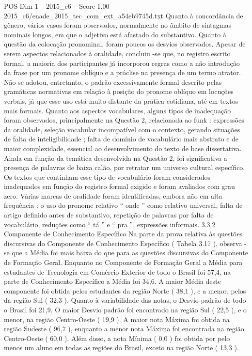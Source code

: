 \begin{textsample}{POS Dim 1 – 2015\_c6 – Score 1.00 – 2015\_c6/enade\_2015\_tec\_com\_ext\_a54eb9745d.txt}
Quanto à concordância de gênero, vários casos foram observados, normalmente no âmbito de sintagmas nominais longos, em que o adjetivo está afastado do substantivo.
Quanto à questão da colocação pronominal, foram poucos os desvios observados.
Apesar de serem aspectos relacionados à oralidade, concluiu -se que, no registro escrito formal, a maioria dos participantes já incorporou regras como a não introdução da frase por um pronome oblíquo e a próclise na presença de um termo atrator.
Não se adotou, entretanto, o padrão excessivamente formal descrito pelas gramáticas normativas em relação à posição do pronome oblíquo em locuções verbais, já que esse uso está muito distante da prática cotidiana, até em textos mais formais.
Quanto aos aspectos vocabulares, alguns tipos de inadequação foram observados, principalmente na Questão 2, relacionada ao funk : expressões da oralidade, seleção vocabular incompatível com o contexto, gerando situações de falta de inteligibilidade ; falta de domínio de vocabulário mais abstrato e de maior complexidade, essencial ao desenvolvimento do texto de base dissertativa.
Ainda em função da temática desenvolvida na Questão 2, foi significativa a presença de palavras de baixa calão, por retratar um universo cultural específico.
Os textos que continham esse tipo de vocabulário foram considerados inadequados em função do registro formal exigido e foram avaliados com grau zero.
Várias marcas de oralidade foram identificadas, embora não em alta frequência : o uso do pronome relativo “ onde ” como relativo universal, falta de artigo definido antes de substantivo, repetição de palavras por falta de vocabulário, reduções como “ tá ” e “ pra ”, expressões informais. 3.3.2 Componente de Conhecimento Específico Na parte da prova relativa às questões discursivas do Componente de Conhecimento Específico ( Tabela 3.17 ), observa -se que a Média foi mais baixa do que para as questões discursivas do Componente de Formação Geral.
Enquanto no Componente de Formação Geral a Média para estudantes de Tecnologia em Comércio Exterior de todo o Brasil foi 57,4, na parte de Conhecimento Específico a Média foi 34,6.
A maior Média deste componente foi obtida pelos estudantes da região Norte ( 38,1 ), e a menor, pelos da região Sul ( 32,3 ).
Quanto à variabilidade das notas, o Desvio padrão de todo o Brasil foi 21,9.
O maior Desvio padrão foi encontrado na região Sul ( 22,5 ), e o menor, na região Centro-Oeste ( 19,9 ).
A maior nota Máxima foi obtida na região Sudeste ( 96,7 ), enquanto a menor nota Máxima foi encontrada na região Centro-Oeste ( 60,0 ).
Além disso, a nota Mínima ( 0,0 ) foi obtida por pelo menos um aluno em todas as regiões do Brasil, exceto na região Norte ( 13,3 ).

\end{textsample}
